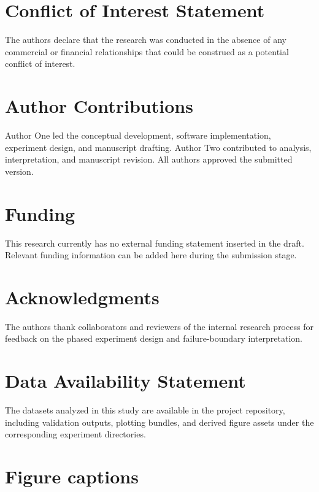 \documentclass[utf8]{FrontiersinHarvard}
\begin{document}
\section*{Conflict of Interest Statement}

The authors declare that the research was conducted in the absence of any commercial or financial relationships that could be construed as a potential conflict of interest.

\section*{Author Contributions}

Author One led the conceptual development, software implementation, experiment design, and manuscript drafting. Author Two contributed to analysis, interpretation, and manuscript revision. All authors approved the submitted version.

\section*{Funding}

This research currently has no external funding statement inserted in the draft. Relevant funding information can be added here during the submission stage.

\section*{Acknowledgments}

The authors thank collaborators and reviewers of the internal research process for feedback on the phased experiment design and failure-boundary interpretation.

\section*{Data Availability Statement}

The datasets analyzed in this study are available in the project repository, including validation outputs, plotting bundles, and derived figure assets under the corresponding experiment directories.




\section*{Figure captions}
\end{document}
